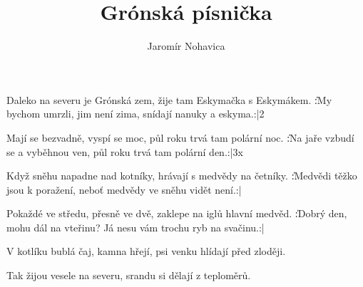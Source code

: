 \beginsong

\title{Grónská písnička}
\author{Jaromír Nohavica}

\beginverse
Daleko na severu je Grónská zem,
žije tam Eskymačka s Eskymákem.
\|:My bychom umrzli, jim není zima,
snídají nanuky a eskyma.:|{2}
\endverse

\beginverse
Mají se bezvadně, vyspí se moc,
půl roku trvá tam polární noc.
\|:Na jaře vzbudí se a vyběhnou ven,
půl roku trvá tam polární den.:|3x
\endverse

\beginverse
Když sněhu napadne nad kotníky,
hrávají s medvědy na četníky.
\|:Medvědi těžko jsou k poražení,
neboť medvědy ve sněhu vidět není.:|{}
\endverse

\beginverse
Pokaždé ve středu, přesně ve dvě,
zaklepe na iglů hlavní medvěd.
\|:Dobrý den, mohu dál na vteřinu?
Já nesu vám trochu ryb na svačinu.:|
\endverse

\beginverse
V kotlíku bublá čaj, kamna hřejí,
psi venku hlídají před zloději.
\endverse

\beginverse
Tak žijou vesele na severu,
srandu si dělají z teploměrů.
\endverse


